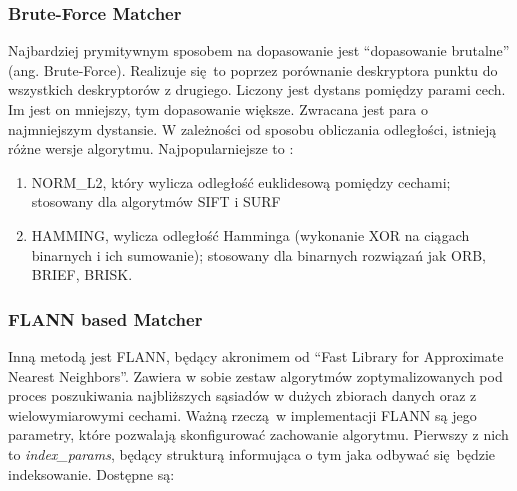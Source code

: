 \documentclass[12pt,twoside,polish]{article}
\begin{document}
\subsubsection{Brute-Force Matcher}
Najbardziej prymitywnym sposobem na dopasowanie jest \enquote{dopasowanie brutalne} (ang. Brute-Force). Realizuje się to poprzez porównanie deskryptora punktu do wszystkich deskryptorów z drugiego. Liczony jest dystans pomiędzy parami cech. Im jest on mniejszy, tym dopasowanie większe. Zwracana jest para o najmniejszym dystansie. W zależności od sposobu obliczania odległości, istnieją różne wersje algorytmu. Najpopularniejsze to \cite[s.573]{learnopencv}:

\begin{enumerate}[label=\alph*), leftmargin=1.25cm]
\item NORM\_L2, który wylicza odległość euklidesową pomiędzy cechami; stosowany dla algorytmów SIFT i SURF
\item HAMMING, wylicza odległość Hamminga (wykonanie XOR na ciągach binarnych i ich sumowanie); stosowany dla binarnych rozwiązań jak ORB, BRIEF, BRISK.
\end{enumerate}

\subsubsection{FLANN based Matcher}
Inną metodą jest FLANN, będący akronimem od \enquote{Fast Library for Approximate Nearest Neighbors}. Zawiera w sobie zestaw algorytmów zoptymalizowanych pod proces poszukiwania najbliższych sąsiadów w dużych zbiorach danych oraz z wielowymiarowymi cechami. Ważną rzeczą w implementacji FLANN są jego parametry, które pozwalają skonfigurować zachowanie algorytmu. Pierwszy z nich to \emph{index\_params}, będący strukturą informująca o tym jaka odbywać się będzie indeksowanie. Dostępne są:
\end{document}
